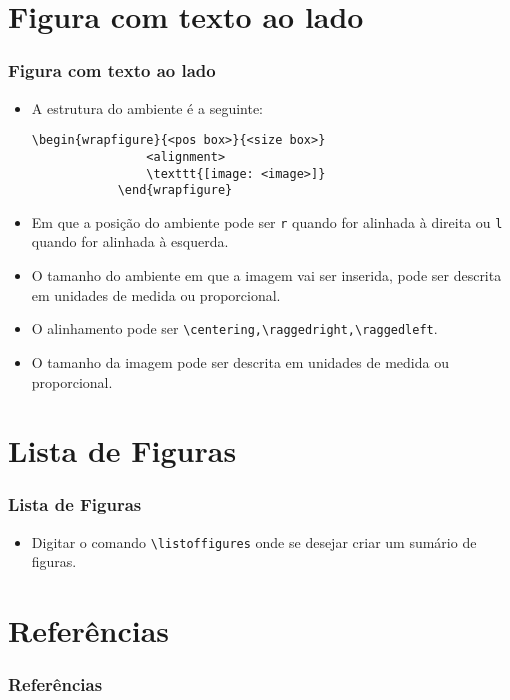 \documentclass[brazilian]{beamer}
\begin{document}
\section{Figura com texto ao lado}
\begin{frame}[fragile]
    \frametitle{Figura com texto ao lado}

    \begin{itemize}
        \item A estrutura do ambiente é a seguinte:
              \begin{lstlisting}[style=myStyleLatex]
            \begin{wrapfigure}{<pos box>}{<size box>}
                <alignment>
                \texttt{[image: <image>]}
            \end{wrapfigure}
        \end{lstlisting}
        \item Em que a posição do ambiente pode ser \texttt{r} quando for alinhada à direita ou \texttt{l} quando for alinhada à esquerda.
        \item O tamanho do ambiente em que a imagem vai ser inserida, pode ser descrita em unidades de medida ou proporcional.
        \item O alinhamento pode ser \lstinline[style=myStyleLatex]!\centering,\raggedright,\raggedleft!.
        \item O tamanho da imagem pode ser descrita em unidades de medida ou proporcional.
    \end{itemize}

\end{frame}

\section{Lista de Figuras}
\begin{frame}[fragile]
    \frametitle{Lista de Figuras}

    \begin{itemize}
        \item Digitar o comando \lstinline[style=myStyleLatex]!\listoffigures! onde se desejar criar um sumário de figuras.
    \end{itemize}

\end{frame}

\section{Referências}
\begin{frame}[allowframebreaks]
    \frametitle{Referências}
    \nocite{*}
    \printbibliography[keyword={inserirImagem}]
\end{frame}
\end{document}
